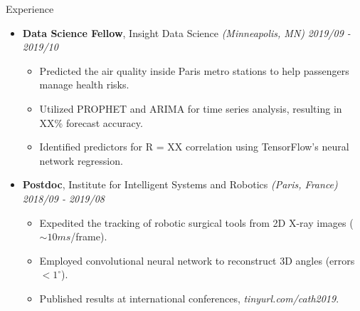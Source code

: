 \documentclass{resume} %
\begin{document}

\begin{rSection}{Experience}
	
	\begin{itemize}
	\item {\bf Data Science Fellow}{, Insight Data Science \textit{(Minneapolis, MN)}} \hfill {\em 2019/09 - 2019/10}\\
	\vspace{-5mm}
	\begin{itemize}
		\setlength\itemsep{-2em}
		\item Predicted the air quality inside Paris metro stations to help passengers manage health risks.\\
		\item Utilized PROPHET and ARIMA for time series analysis, resulting in XX\% forecast accuracy.\\
		\item Identified predictors for R = XX correlation using TensorFlow's neural network regression.
	\end{itemize}
	
	
	\item {\bf Postdoc}{, Institute for Intelligent Systems and Robotics \textit{(Paris, France)}} \hfill {\em 2018/09 - 2019/08}\\
	\vspace{-5mm}
	\begin{itemize}
		\setlength\itemsep{-2em}
		\item  Expedited the tracking of robotic surgical tools from 2D X-ray images ($\sim 10 ms$/frame).\\ 
		\item  Employed convolutional neural network to reconstruct 3D angles (errors $< 1 ^\circ$).\\
		\item  Published results at international conferences, \textit{tinyurl.com/cath2019}.
	\end{itemize}
	
	
	

\end{itemize}
\end{rSection}
\end{document}
